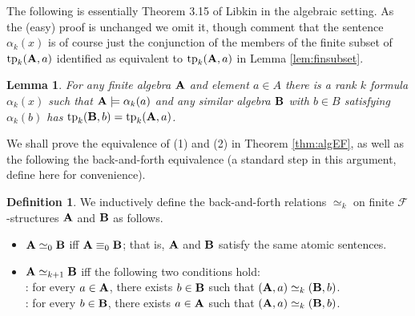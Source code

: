 \documentclass[10pt,a4paper]{amsart}
\theoremstyle{plain}
\newtheorem{lem}[thm]{Lemma}
\theoremstyle{definition}
\newtheorem{defn}[thm]{Definition}
\newcommand{\tp}{\operatorname{tp}}
\begin{document}
The following is essentially Theorem 3.15 of Libkin \cite{lib} in the algebraic setting.  As the (easy) proof is unchanged we omit it, though comment that the sentence $\alpha_k(x)$ is of course just the conjunction of the members of the finite subset of $\tp_k({\bf A},a)$ identified as equivalent to $\tp_k({\bf A},a)$ in Lemma \ref{lem:finsubset}.
\begin{lem}\label{lem:type}
For any finite algebra ${\bf A}$ and element $a\in A$ there is a rank $k$ formula $\alpha_k(x)$ such that ${\bf A}\models \alpha_k(a)$ and any similar algebra ${\bf B}$ with $b\in B$ satisfying $\alpha_k(b)$ has $\tp_k({\bf B},b)=\tp_k({\bf A},a)$.
\end{lem}

We shall prove the equivalence of (1) and (2) in  Theorem \ref{thm:algEF}, as well as the following the back-and-forth equivalence (a standard step in this argument, define here for convenience).
\begin{defn}\label{defn:backNforth}
We inductively define the back-and-forth relations $\simeq_k$ on finite $\mathcal{F}$-structures ${\bf A}$ and ${\bf B}$ as follows.
\begin{itemize}
\item ${\bf A}\simeq_0{\bf B}$ iff ${\bf A}\equiv_0{\bf B}$; that is, ${\bf A}$ and ${\bf B}$ satisfy the same atomic sentences.
\item ${\bf A}\simeq_{k+1}{\bf B}$ iff the following two conditions hold:\hfill\\
: for every $a\in{\bf  A}$, there exists $b\in{\bf B}$ such that $({\bf A}, a)\simeq_k({\bf B},b)$.\\
: for every $b\in{\bf B}$, there exists $a\in{\bf A}$ such that $({\bf A}, a)\simeq_k({\bf B},b)$.
\end{itemize}
\end{defn}
\end{document}
